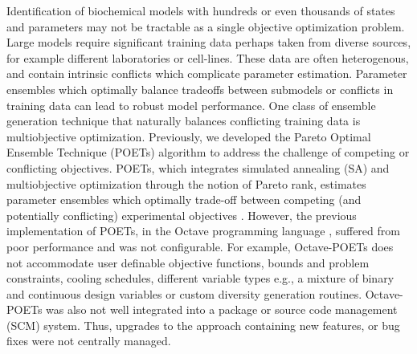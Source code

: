 \documentclass{bmcart}
\begin{document}
Identification of biochemical models with hundreds or even thousands of states and parameters may not be tractable as a single objective optimization problem.
Large models require significant training data perhaps taken from diverse sources, for example different laboratories or cell-lines.
These data are often heterogenous, and contain intrinsic conflicts which complicate parameter estimation.
Parameter ensembles which optimally balance tradeoffs between submodels or conflicts in training data can
lead to robust model performance. One class of ensemble generation technique that naturally balances conflicting training data is multiobjective optimization.
Previously, we developed the Pareto Optimal Ensemble Technique (POETs) algorithm to address the challenge of competing or conflicting objectives.
POETs, which integrates simulated annealing (SA) and multiobjective optimization through the notion of Pareto rank, estimates parameter ensembles which optimally trade-off between
competing (and potentially conflicting) experimental objectives \cite{Song:2010aa}.
However, the previous implementation of POETs, in the Octave programming language \cite{CITE_Octave}, suffered from poor performance and was not configurable.
For example, Octave-POETs does not accommodate user definable objective functions, bounds and problem constraints, cooling schedules, different variable types e.g., a mixture of binary and continuous design variables or custom diversity generation routines. Octave-POETs was also not well integrated into a package or
source code management (SCM) system. Thus, upgrades to the approach containing new features, or bug fixes were not centrally managed.
\end{document}
